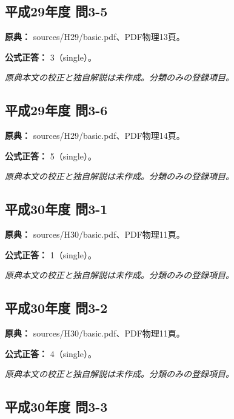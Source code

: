 \subsection{平成29年度 問3-5}
\label{q:h29-reg-basic-3-5}

\noindent\textbf{原典：} sources/H29/basic.pdf、PDF物理13頁。

\textbf{公式正答：} 3（single）。

\par\textit{原典本文の校正と独自解説は未作成。分類のみの登録項目。}

\subsection{平成29年度 問3-6}
\label{q:h29-reg-basic-3-6}

\noindent\textbf{原典：} sources/H29/basic.pdf、PDF物理14頁。

\textbf{公式正答：} 5（single）。

\par\textit{原典本文の校正と独自解説は未作成。分類のみの登録項目。}

\subsection{平成30年度 問3-1}
\label{q:h30-reg-basic-3-1}

\noindent\textbf{原典：} sources/H30/basic.pdf、PDF物理11頁。

\textbf{公式正答：} 1（single）。

\par\textit{原典本文の校正と独自解説は未作成。分類のみの登録項目。}

\subsection{平成30年度 問3-2}
\label{q:h30-reg-basic-3-2}

\noindent\textbf{原典：} sources/H30/basic.pdf、PDF物理11頁。

\textbf{公式正答：} 4（single）。

\par\textit{原典本文の校正と独自解説は未作成。分類のみの登録項目。}

\subsection{平成30年度 問3-3}
\label{q:h30-reg-basic-3-3}

